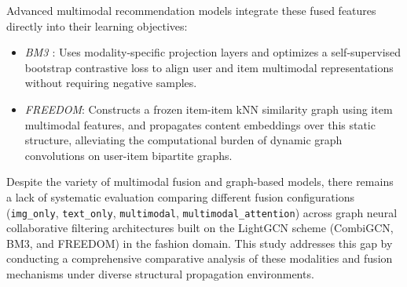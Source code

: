 Advanced multimodal recommendation models integrate these fused features directly into their learning objectives:
\begin{itemize}
    \item \textit{BM3 \parencite{10.1145/3543507.3583251}}: Uses modality-specific projection layers and optimizes a self-supervised bootstrap contrastive loss to align user and item multimodal representations without requiring negative samples.
    \item \textit{FREEDOM}: Constructs a frozen item-item kNN similarity graph using item multimodal features, and propagates content embeddings over this static structure, alleviating the computational burden of dynamic graph convolutions on user-item bipartite graphs.
\end{itemize}

Despite the variety of multimodal fusion and graph-based models, there remains a lack of systematic evaluation comparing different fusion configurations (\texttt{img\_only}, \texttt{text\_only}, \texttt{multimodal}, \texttt{multimodal\_attention}) across graph neural collaborative filtering architectures built on the LightGCN scheme (CombiGCN, BM3, and FREEDOM) in the fashion domain. This study addresses this gap by conducting a comprehensive comparative analysis of these modalities and fusion mechanisms under diverse structural propagation environments.
